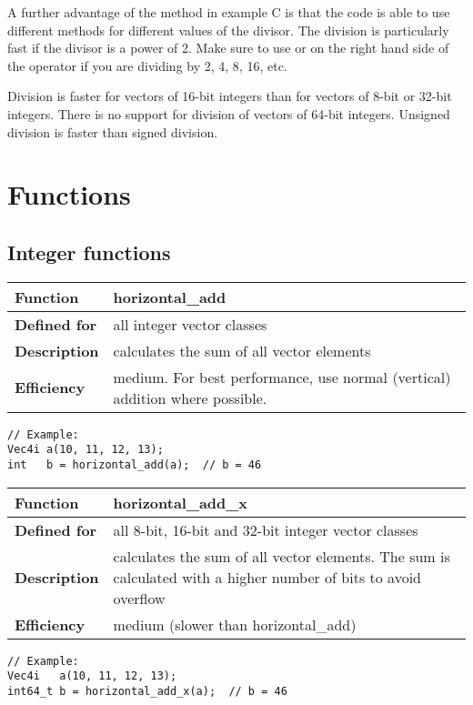 \documentclass[vcl_manual.tex]{subfiles}
\begin{document}
A further advantage of the method in example C is that the code is able to use different methods for different values of the divisor. The division is particularly fast if the divisor is a power of 2. Make sure to use  or  on the right hand side of the \codei{/} operator if you are dividing by 2, 4, 8, 16, etc.

Division is faster for vectors of 16-bit integers than for vectors of 8-bit or 32-bit integers. There is no support for division of vectors of 64-bit integers. Unsigned division is faster than signed division.


\chapter{Functions}\label{chap:Functions}

\section{Integer functions}
\flushleft

\begin{tabular}{|p{25mm}|p{100mm}|}
\hline
\bfseries Function & horizontal\_add \\ \hline
\bfseries Defined for & all integer vector classes \\ \hline
\bfseries Description & calculates the sum of all vector elements \\ \hline
\bfseries Efficiency & medium. For best performance, use normal (vertical) addition where possible. \\ \hline
\end{tabular}
\begin{lstlisting}[frame=none]
// Example:
Vec4i a(10, 11, 12, 13);
int   b = horizontal_add(a);  // b = 46
\end{lstlisting}


\begin{tabular}{|p{25mm}|p{100mm}|}
\hline
\bfseries Function & horizontal\_add\_x \\ \hline
\bfseries Defined for & all 8-bit, 16-bit and 32-bit integer vector classes \\ \hline
\bfseries Description & calculates the sum of all vector elements. The sum is calculated with a higher number of bits to avoid overflow
 \\ \hline
\bfseries Efficiency & medium (slower than horizontal\_add) \\ \hline
\end{tabular}
\begin{lstlisting}[frame=none]
// Example:
Vec4i   a(10, 11, 12, 13);
int64_t b = horizontal_add_x(a);  // b = 46
\end{lstlisting}
\end{document}

